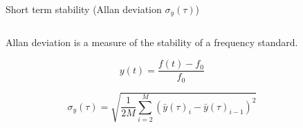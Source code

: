 \begin{frame}{Short term stability (Allan deviation $\sigma_y(\tau)$)}

    \begin{columns}[c, onlytextwidth]

        \begin{column}{0.5\textwidth}

            Allan deviation is a measure of the stability of a frequency standard.

            \begin{equation*}
                y(t) = \frac{f(t) - f_0}{f_0}
            \end{equation*}

            \begin{equation*}
                \sigma_y(\tau) = \sqrt{\frac{1}{2M} \sum_{i=2}^{M} (\bar{y}(\tau)_{i} - \bar{y}(\tau)_{i-1})^2}
            \end{equation*}

        \end{column}

        \hfill

        \begin{column}{0.45\textwidth}


\end{column}
\end{columns}
\end{frame}
